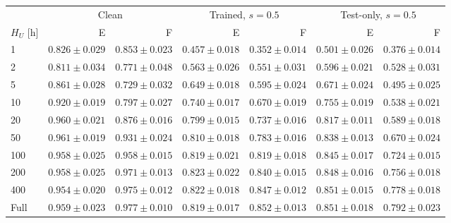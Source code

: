 \begin{tabular*}{\textwidth}{@{\extracolsep{\fill}}lrrrrrr@{}}
\toprule
& \multicolumn{2}{c}{Clean} & \multicolumn{2}{c}{Trained, $s=0.5$} & \multicolumn{2}{c}{Test-only, $s=0.5$} \\
$H_U$ [h] & E & F & E & F & E & F \\
\midrule
1 & $0.826\pm0.029$ & $0.853\pm0.023$ & $0.457\pm0.018$ & $0.352\pm0.014$ & $0.501\pm0.026$ & $0.376\pm0.014$ \\
2 & $0.811\pm0.034$ & $0.771\pm0.048$ & $0.563\pm0.026$ & $0.551\pm0.031$ & $0.596\pm0.021$ & $0.528\pm0.031$ \\
5 & $0.861\pm0.028$ & $0.729\pm0.032$ & $0.649\pm0.018$ & $0.595\pm0.024$ & $0.671\pm0.024$ & $0.495\pm0.025$ \\
10 & $0.920\pm0.019$ & $0.797\pm0.027$ & $0.740\pm0.017$ & $0.670\pm0.019$ & $0.755\pm0.019$ & $0.538\pm0.021$ \\
20 & $0.960\pm0.021$ & $0.876\pm0.016$ & $0.799\pm0.015$ & $0.737\pm0.016$ & $0.817\pm0.011$ & $0.589\pm0.018$ \\
50 & $0.961\pm0.019$ & $0.931\pm0.024$ & $0.810\pm0.018$ & $0.783\pm0.016$ & $0.838\pm0.013$ & $0.670\pm0.024$ \\
100 & $0.958\pm0.025$ & $0.958\pm0.015$ & $0.819\pm0.021$ & $0.819\pm0.018$ & $0.845\pm0.017$ & $0.724\pm0.015$ \\
200 & $0.958\pm0.025$ & $0.971\pm0.013$ & $0.823\pm0.022$ & $0.840\pm0.015$ & $0.848\pm0.016$ & $0.756\pm0.018$ \\
400 & $0.954\pm0.020$ & $0.975\pm0.012$ & $0.822\pm0.018$ & $0.847\pm0.012$ & $0.851\pm0.015$ & $0.778\pm0.018$ \\
Full & $0.959\pm0.023$ & $0.977\pm0.010$ & $0.819\pm0.017$ & $0.852\pm0.013$ & $0.851\pm0.018$ & $0.792\pm0.023$ \\
\bottomrule
\end{tabular*}

